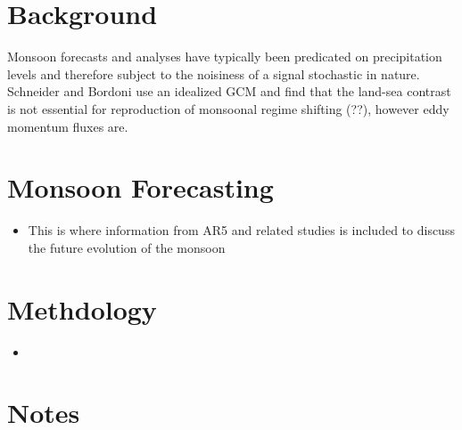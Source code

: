 \documentclass[11pt,reqno]{amsart}
\begin{document}
\section{Background}

Monsoon forecasts and analyses have typically been predicated on precipitation levels and therefore subject to the noisiness of a signal stochastic in nature.  Schneider and Bordoni use an idealized GCM and find that the land-sea contrast is not essential for reproduction of monsoonal regime shifting (??), however eddy momentum fluxes are.  



\section{Monsoon Forecasting}

	\begin{itemize}
		\item This is where information from AR5 and related studies is included to discuss the future evolution of the monsoon 
	\end{itemize}


\section{Methdology}
	\begin{itemize}
		\item 
	\end{itemize}



\section{Notes}
\end{document}
